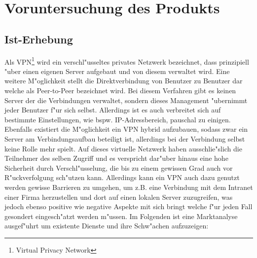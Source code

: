 \documentclass[a4paper,12pt]{scrreprt}
\begin{document}
\chapter{Voruntersuchung des Produkts}
	\section{Ist-Erhebung}
	
	Als VPN\footnote{Virtual Privacy Network} wird ein verschl"usseltes privates Netzwerk bezeichnet, dass prinzipiell "uber einen eigenen Server aufgebaut und von diesem verwaltet wird. Eine weitere M"oglichkeit stellt die Direktverbindung von Benutzer zu Benutzer dar welche als Peer-to-Peer bezeichnet wird. Bei diesem Verfahren gibt es keinen Server der die Verbindungen verwaltet, sondern dieses Management "ubernimmt jeder Benutzer f"ur sich selbst. Allerdings ist es auch verbreitet sich auf bestimmte Einstellungen, wie bspw. IP-Adressbereich, pauschal zu einigen. Ebenfalls existiert die M"oglichkeit ein VPN hybrid aufzubauen, sodass zwar ein Server am Verbindungsaufbau beteiligt ist, allerdings bei der Verbindung selbst keine Rolle mehr spielt. Auf dieses virtuelle Netzwerk haben ausschlie"slich die Teilnehmer des selben Zugriff und es verspricht dar"uber hinaus eine hohe Sicherheit durch Verschl"usselung, die bis zu einem gewissen Grad auch vor R"uckverfolgung sch"utzen kann. Allerdings kann ein VPN auch dazu genutzt werden gewisse Barrieren zu umgehen, um z.B. eine Verbindung mit dem Intranet einer Firma herzustellen und dort auf einen lokalen Server zuzugreifen, was jedoch ebenso positive wie negative Aspekte mit sich bringt welche f"ur jeden Fall gesondert eingesch"atzt werden m"ussen. Im Folgenden ist eine Marktanalyse ausgef"uhrt um existente Dienste und ihre Schw"achen aufzuzeigen:
	
\end{document}

